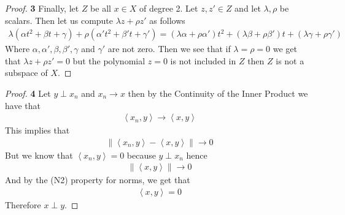 \documentclass[11pt]{article}
\newcommand{\inprd}[1]{\left\langle{#1}\right\rangle}
\theoremstyle{definition}
\begin{document}
\begin{proof}{\textbf{3}}
\cleardoublepage
Finally, let $Z$ be all $x\in X$ of degree 2. Let $z, z' \in Z$ and let
$\lambda, \rho$ be scalars. Then let us compute $\lambda z + \rho z'$ as
follows
\begin{align*}
    \lambda(\alpha t^2 + \beta t + \gamma) + \rho(\alpha' t^2 + \beta' t + \gamma')
    = (\lambda\alpha + \rho\alpha')t^2 + (\lambda\beta + \rho\beta')t + (\lambda\gamma + \rho\gamma')
\end{align*}
Where $\alpha, \alpha', \beta, \beta', \gamma$ and $\gamma'$ are not zero.
Then we see that if $\lambda = \rho = 0$ we get that $\lambda z + \rho z' = 0$
but the polynomial $z = 0$ is not included in $Z$ then $Z$ is not a subspace
of $X$.
\end{proof}
\begin{proof}{\textbf{4}}
Let $y \perp x_n$ and $x_n \to x$ then by the Continuity of the Inner Product
we have that
\begin{align*}
    \inprd{x_n, y} \to \inprd{x, y}
\end{align*}
This implies that
\begin{align*}
    \|\inprd{x_n, y} - \inprd{x, y}\| \to 0
\end{align*}
But we know that $\inprd{x_n, y} = 0$ because $y \perp x_n$ hence
\begin{align*}
    \|\inprd{x, y}\| \to 0
\end{align*}
And by the (N2) property for norms, we get that
\begin{align*}
    \inprd{x, y} = 0
\end{align*}
Therefore $x \perp y$.
\end{proof}
\end{document}

